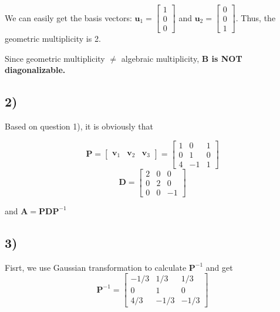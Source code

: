 \documentclass{article}
\newcommand{\0}{{\mathbf{0}}} %
\begin{document}
We can easily get the basis vectors: $\mathbf{u}_1 =
\begin{bmatrix} 1 \\ 0 \\ 0
\end{bmatrix}$ and $\mathbf{u}_2 =
\begin{bmatrix} 0 \\ 0 \\ 1
\end{bmatrix}$.
Thus, the geometric multiplicity is 2.

Since geometric multiplicity $\neq$ algebraic multiplicity, \textbf{$\mathbf{B}$ is NOT diagonalizable.}

\subsection*{2)}

Based on question 1), it is obviously that

$$
\mathbf{P} =
\begin{bmatrix} \mathbf{v}_1 & \mathbf{v}_2 & \mathbf{v}_3
\end{bmatrix} =
\begin{bmatrix} 1 & 0 & 1 \\ 0 & 1 & 0 \\ 4 & -1 & 1
\end{bmatrix}
$$
$$
\mathbf{D} =
\begin{bmatrix} 2 & 0 & 0 \\ 0 & 2 & 0 \\ 0 & 0 & -1
\end{bmatrix}
$$

and $\mathbf{A} = \mathbf{P}\mathbf{D}\mathbf{P}^{-1}$

\subsection*{3)}
Fisrt, we use Gaussian transformation to calculate $\mathbf{P}^{-1}$
and get
\[
\mathbf{P}^{-1} =
\begin{bmatrix} -1/3 & 1/3 & 1/3 \\ 0 & 1 & 0 \\ 4/3 & -1/3 & -1/3
\end{bmatrix}
\]
\end{document}

